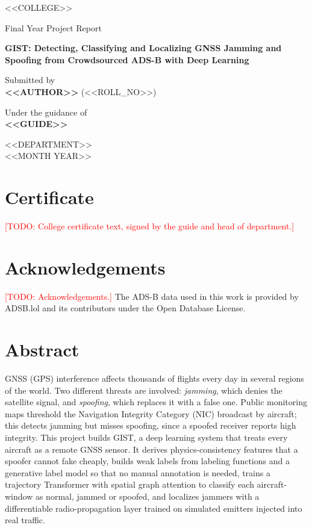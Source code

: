 \documentclass[12pt,a4paper,oneside]{report}
\newcommand{\todo}[1]{\textcolor{red}{[TODO: #1]}}
\begin{document}
\begin{titlepage}\centering
{\Large <<COLLEGE>>\par}\vspace{1cm}
{\large Final Year Project Report\par}\vspace{2cm}
{\huge\bfseries GIST: Detecting, Classifying and Localizing GNSS Jamming and Spoofing from Crowdsourced ADS-B with Deep Learning\par}\vspace{2cm}
{\large Submitted by\\ \textbf{<<AUTHOR>>} (<<ROLL\_NO>>)\par}\vspace{1cm}
{\large Under the guidance of\\ \textbf{<<GUIDE>>}\par}\vfill
{\large <<DEPARTMENT>>\\ <<MONTH YEAR>>\par}
\end{titlepage}

\chapter*{Certificate}
\todo{College certificate text, signed by the guide and head of department.}

\chapter*{Acknowledgements}
\todo{Acknowledgements.} The ADS-B data used in this work is provided by ADSB.lol and its contributors under the Open Database License.

\chapter*{Abstract}
GNSS (GPS) interference affects thousands of flights every day in several regions of the world. Two different threats are
involved: \emph{jamming}, which denies the satellite signal, and \emph{spoofing}, which replaces it with a false one.
Public monitoring maps threshold the Navigation Integrity Category (NIC) broadcast by aircraft; this detects jamming but
misses spoofing, since a spoofed receiver reports high integrity. This project builds GIST, a deep learning system that
treats every aircraft as a remote GNSS sensor. It derives physics-consistency features that a spoofer cannot fake cheaply,
builds weak labels from labeling functions and a generative label model so that no manual annotation is needed, trains a
trajectory Transformer with spatial graph attention to classify each aircraft-window as normal, jammed or spoofed, and
localizes jammers with a differentiable radio-propagation layer trained on simulated emitters injected into real traffic.
\resultsabstract
\end{document}
